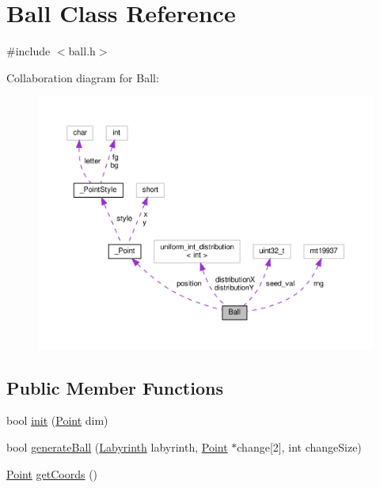 \hypertarget{class_ball}{}\section{Ball Class Reference}
\label{class_ball}


{\ttfamily \#include $<$ball.\+h$>$}



Collaboration diagram for Ball\+:
\nopagebreak
\begin{figure}[H]
\begin{center}
\leavevmode
\includegraphics[width=350pt]{class_ball__coll__graph}
\end{center}
\end{figure}
\subsection*{Public Member Functions}
\begin{DoxyCompactItemize}
\item 
bool \mbox{\hyperlink{class_ball_a1907f13fdfb320a19180efec2a56e39c}{init}} (\mbox{\hyperlink{common_8h_aa9cfdb80b4ca12013a2de8a3b9b97981}{Point}} dim)
\item 
bool \mbox{\hyperlink{class_ball_a60fd40459426366242d18d85b3b50c2c}{generate\+Ball}} (\mbox{\hyperlink{class_labyrinth}{Labyrinth}} labyrinth, \mbox{\hyperlink{common_8h_aa9cfdb80b4ca12013a2de8a3b9b97981}{Point}} $\ast$change\mbox{[}2\mbox{]}, int change\+Size)
\item 
\mbox{\hyperlink{common_8h_aa9cfdb80b4ca12013a2de8a3b9b97981}{Point}} \mbox{\hyperlink{class_ball_a14b9a607402be58e7a0a0ab053df5f82}{get\+Coords}} ()
\end{DoxyCompactItemize}
